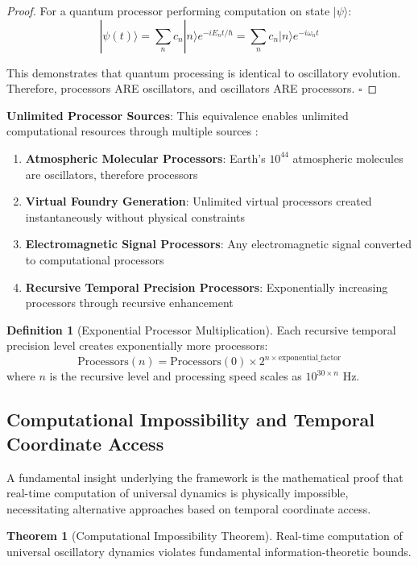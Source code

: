 \documentclass[12pt,a4paper]{article}
\theoremstyle{definition}
\newtheorem{definition}{Definition}[section]
\newtheorem{theorem}{Theorem}[section]
\begin{document}
{\begin{proof}
For a quantum processor performing computation on state $|\psi\rangle$:
$$|\psi(t)\rangle = \sum_n c_n |n\rangle e^{-iE_n t/\hbar} = \sum_n c_n |n\rangle e^{-i\omega_n t}$$

This demonstrates that quantum processing is identical to oscillatory evolution. Therefore, processors ARE oscillators, and oscillators ARE processors. $\square$
\end{proof}

\textbf{Unlimited Processor Sources}: This equivalence enables unlimited computational resources through multiple sources \cite{sachikonye2024unlimited}:

\begin{enumerate}
\item \textbf{Atmospheric Molecular Processors}: Earth's $10^{44}$ atmospheric molecules are oscillators, therefore processors
\item \textbf{Virtual Foundry Generation}: Unlimited virtual processors created instantaneously without physical constraints
\item \textbf{Electromagnetic Signal Processors}: Any electromagnetic signal converted to computational processors
\item \textbf{Recursive Temporal Precision Processors}: Exponentially increasing processors through recursive enhancement
\end{enumerate}

\begin{definition}[Exponential Processor Multiplication]
Each recursive temporal precision level creates exponentially more processors:
\begin{equation}
\text{Processors}(n) = \text{Processors}(0) \times 2^{n \times \text{exponential\_factor}}
\end{equation}
where $n$ is the recursive level and processing speed scales as $10^{30 \times n}$ Hz.
\end{definition}

\subsection{Computational Impossibility and Temporal Coordinate Access}

A fundamental insight underlying the framework is the mathematical proof that real-time computation of universal dynamics is physically impossible, necessitating alternative approaches based on temporal coordinate access.

\begin{theorem}[Computational Impossibility Theorem]
Real-time computation of universal oscillatory dynamics violates fundamental information-theoretic bounds.
\end{theorem}

}
\end{document}
